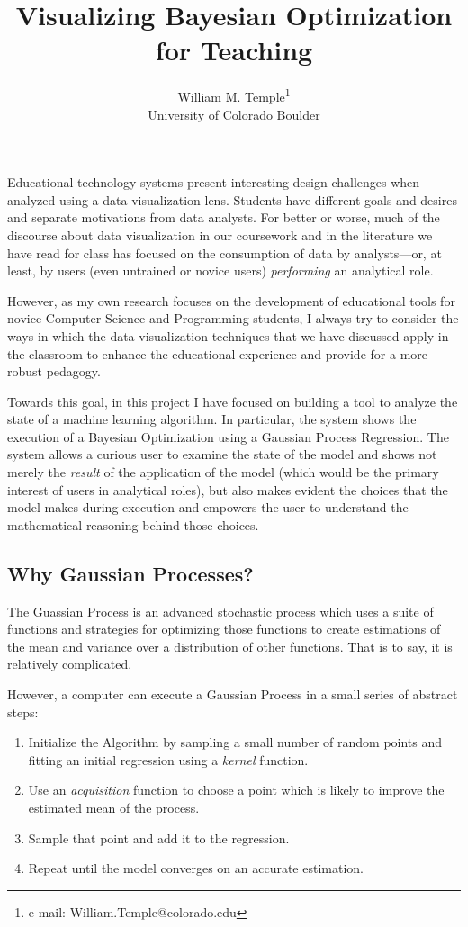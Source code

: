 \documentclass{vgtc}                          %
\title{Visualizing Bayesian Optimization for Teaching}
\author{William M. Temple\thanks{e-mail: William.Temple@colorado.edu}\\ %
        \scriptsize University of Colorado Boulder
}%
\begin{document}

\maketitle

Educational technology systems present interesting design challenges when
analyzed using a data-visualization lens.  Students have different goals
and desires and separate motivations from data analysts. For better or
worse, much of the discourse about data visualization in our coursework
and in the literature we have read for class has focused on the consumption
of data by analysts---or, at least, by users (even untrained or novice users)
\textit{performing} an analytical role.

However, as my own research focuses on the development of educational tools for
novice Computer Science and Programming students, I always try to consider the
ways in which the data visualization techniques that we have discussed apply in
the classroom to enhance the educational experience and provide for a more
robust pedagogy.

Towards this goal, in this project I have focused on building a tool to analyze
the state of a machine learning algorithm. In particular, the system shows the
execution of a Bayesian Optimization using a Gaussian Process Regression. The
system allows a curious user to examine the state of the model and shows not
merely the \textit{result} of the application of the model (which would be the
primary interest of users in analytical roles), but also makes evident the
choices that the model makes during execution and empowers the user to
understand the mathematical reasoning behind those choices.

\subsection{Why Gaussian Processes?}

The Guassian Process is an advanced stochastic process which uses a suite of
functions and strategies for optimizing those functions to create estimations
of the mean and variance over a distribution of other functions. That is to say,
it is relatively complicated.

However, a computer can execute a Gaussian Process in a small series of abstract steps:

\begin{enumerate}

	\item Initialize the Algorithm by sampling a small number of random
		points and fitting an initial regression using a
		\textit{kernel} function.

	\item Use an \textit{acquisition} function to choose a point which is
		likely to improve the estimated mean of the process.

	\item Sample that point and add it to the regression.

	\item Repeat until the model converges on an accurate estimation.
\end{enumerate}
\end{document}
